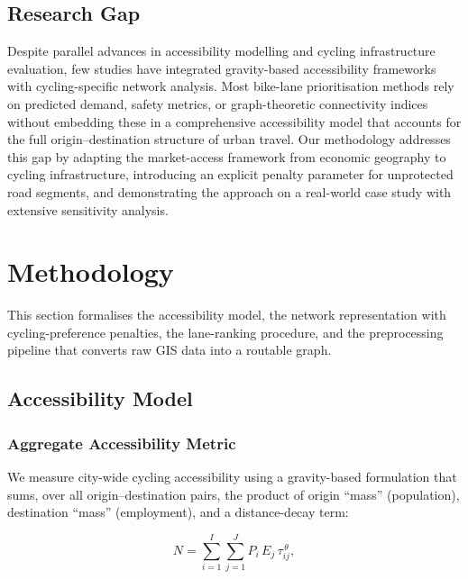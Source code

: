 \documentclass[12pt,a4paper]{article}
\begin{document}
\subsection{Research Gap}

Despite parallel advances in accessibility modelling and cycling infrastructure evaluation, few studies have integrated gravity-based accessibility frameworks with cycling-specific network analysis. Most bike-lane prioritisation methods rely on predicted demand, safety metrics, or graph-theoretic connectivity indices without embedding these in a comprehensive accessibility model that accounts for the full origin--destination structure of urban travel. Our methodology addresses this gap by adapting the market-access framework from economic geography to cycling infrastructure, introducing an explicit penalty parameter for unprotected road segments, and demonstrating the approach on a real-world case study with extensive sensitivity analysis.

\section{Methodology}
\label{sec:methodology}

This section formalises the accessibility model, the network representation with cycling-preference penalties, the lane-ranking procedure, and the preprocessing pipeline that converts raw GIS data into a routable graph.

\subsection{Accessibility Model}
\label{sec:model}

\subsubsection{Aggregate Accessibility Metric}

We measure city-wide cycling accessibility using a gravity-based formulation that sums, over all origin--destination pairs, the product of origin ``mass'' (population), destination ``mass'' (employment), and a distance-decay term:

\begin{equation}
N = \sum_{i=1}^{I} \sum_{j=1}^{J} P_i \, E_j \, \tau_{ij}^{\,\theta},
\label{eq:accessibility}
\end{equation}
\end{document}

